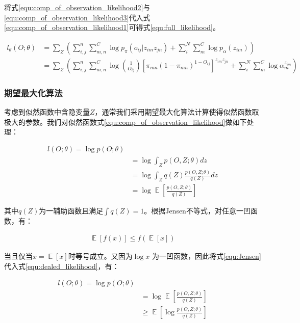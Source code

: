 将式\ref{equ:comp_of_observation_likelihood2}与\ref{equ:comp_of_observation_likelihood3}代入式\ref{equ:comp_of_observation_likelihood1}可得式\ref{equ:full_likelihood}。

\begin{equation}\label{equ:full_likelihood}
  \begin{aligned}
l_\theta(O;\theta) &= \sum_Z(\sum_{i,j}^{n}\sum_{m,n}^C\log p_\pi(o_{ij}|z_{im}z_{jn})+\sum_{i}^N\sum_m^C\log p_\alpha(z_
{im}))\\ &=\sum_Z(\sum_{i,j}^{n}\sum_{m,n}^C\log \binom{1}{O_{ij}}[\pi_{mn}(1-\pi_{mn})^{1-O_{ij}}]^{ z_{im}z_{jn}}+\sum_
{i}^N\sum_m^C\log\alpha_m^{z_{im}})
  \end{aligned}
\end{equation}

\subsubsection{期望最大化算法}

考虑到似然函数中含隐变量$Z$，通常我们采用期望最大化算法\cite{dempster_maximum_1977}计算使得似然函数取极大的参数。我们对似然函数式\ref{equ:comp_of_observation_likelihood}做如下处理：

\begin{equation}\label{equ:dealed_likelihood}
  \begin{aligned}
    l(O;\theta)=\log p(O;\theta)\\
&=\log \int_Zp(O,Z;\theta)dz\\
&=\log \int_Z q(Z)\frac{p(O,Z;\theta)}{q(Z)}dz\\
&=\log \mathop{\mathbb{E}}[\frac{p(O,Z;\theta)}{q(Z)}]
  \end{aligned}
\end{equation}


其中$q(Z)$为一辅助函数且满足$\int q(Z)=1$。根据Jensen不等式\cite{jensen_sur_1906}，对任意一凹函数，有：

\begin{equation}\label{equ:Jensen}
  \begin{aligned}
    \mathop{\mathbb{E}}[f(x)]\leq f(\mathop{\mathbb{E}}[x])
  \end{aligned}
\end{equation}

当且仅当$x=\mathop{\mathbb{E}}[x]$时等号成立。又因为$\log x$ 为一凹函数，因此将式\ref{equ:Jensen}代入式\ref{equ:dealed_likelihood}，有：

\begin{equation}\label{equ:jensen_in_likelihood}
  \begin{aligned}
l(O;\theta)=\log p(O;\theta)\\
&=\log \mathop{\mathbb{E}}[\frac{p(O,Z;\theta)}{q(Z)}]\\
&\geq  \mathop{\mathbb{E}}[\log\frac{p(O,Z;\theta)}{q(Z)}]
\end{aligned}\end{equation}

